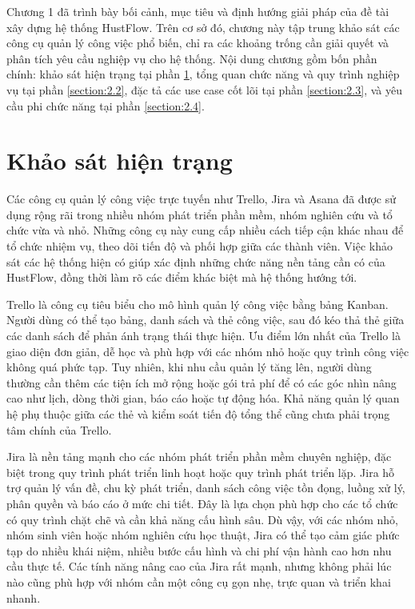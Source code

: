 \documentclass[../DoAn.tex]{subfiles}
\begin{document}
Chương 1 đã trình bày bối cảnh, mục tiêu và định hướng giải pháp của đề tài xây dựng hệ thống HustFlow. Trên cơ sở đó, chương này tập trung khảo sát các công cụ quản lý công việc phổ biến, chỉ ra các khoảng trống cần giải quyết và phân tích yêu cầu nghiệp vụ cho hệ thống. Nội dung chương gồm bốn phần chính: khảo sát hiện trạng tại phần \ref{section:2.1}, tổng quan chức năng và quy trình nghiệp vụ tại phần \ref{section:2.2}, đặc tả các use case cốt lõi tại phần \ref{section:2.3}, và yêu cầu phi chức năng tại phần \ref{section:2.4}.

\section{Khảo sát hiện trạng}
\label{section:2.1}

Các công cụ quản lý công việc trực tuyến như Trello, Jira và Asana đã được sử dụng rộng rãi trong nhiều nhóm phát triển phần mềm, nhóm nghiên cứu và tổ chức vừa và nhỏ. Những công cụ này cung cấp nhiều cách tiếp cận khác nhau để tổ chức nhiệm vụ, theo dõi tiến độ và phối hợp giữa các thành viên. Việc khảo sát các hệ thống hiện có giúp xác định những chức năng nền tảng cần có của HustFlow, đồng thời làm rõ các điểm khác biệt mà hệ thống hướng tới.

Trello là công cụ tiêu biểu cho mô hình quản lý công việc bằng bảng Kanban. Người dùng có thể tạo bảng, danh sách và thẻ công việc, sau đó kéo thả thẻ giữa các danh sách để phản ánh trạng thái thực hiện. Ưu điểm lớn nhất của Trello là giao diện đơn giản, dễ học và phù hợp với các nhóm nhỏ hoặc quy trình công việc không quá phức tạp. Tuy nhiên, khi nhu cầu quản lý tăng lên, người dùng thường cần thêm các tiện ích mở rộng hoặc gói trả phí để có các góc nhìn nâng cao như lịch, dòng thời gian, báo cáo hoặc tự động hóa. Khả năng quản lý quan hệ phụ thuộc giữa các thẻ và kiểm soát tiến độ tổng thể cũng chưa phải trọng tâm chính của Trello.

Jira là nền tảng mạnh cho các nhóm phát triển phần mềm chuyên nghiệp, đặc biệt trong quy trình phát triển linh hoạt hoặc quy trình phát triển lặp. Jira hỗ trợ quản lý vấn đề, chu kỳ phát triển, danh sách công việc tồn đọng, luồng xử lý, phân quyền và báo cáo ở mức chi tiết. Đây là lựa chọn phù hợp cho các tổ chức có quy trình chặt chẽ và cần khả năng cấu hình sâu. Dù vậy, với các nhóm nhỏ, nhóm sinh viên hoặc nhóm nghiên cứu học thuật, Jira có thể tạo cảm giác phức tạp do nhiều khái niệm, nhiều bước cấu hình và chi phí vận hành cao hơn nhu cầu thực tế. Các tính năng nâng cao của Jira rất mạnh, nhưng không phải lúc nào cũng phù hợp với nhóm cần một công cụ gọn nhẹ, trực quan và triển khai nhanh.
\end{document}
